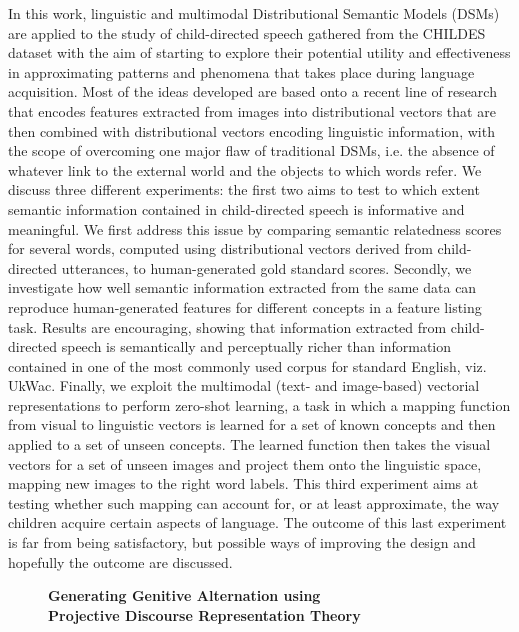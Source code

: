 \documentclass[10pt, a4paper, twopage, headinclude, footinclude, BCOR5mm]{scrartcl}
\begin{document}
\noindent
  In this work, linguistic and multimodal Distributional Semantic Models (DSMs) are applied to the study of child-directed speech gathered from the CHILDES dataset with the aim of starting to explore their potential utility and effectiveness in approximating patterns and phenomena that takes place during language acquisition. Most of the ideas developed are based onto a recent line of research that encodes features extracted from images into distributional vectors that are then combined with distributional vectors encoding linguistic information, with the scope of overcoming one major flaw of traditional DSMs, i.e. the absence of whatever link to the external world and the objects to which words refer.   We discuss three different experiments: the first two aims to test to which extent semantic information contained in child-directed speech is informative and meaningful. We first address this issue by comparing semantic relatedness scores for several words, computed using distributional vectors derived from child-directed utterances, to human-generated gold standard scores. Secondly, we investigate how well semantic information extracted from the same data can reproduce human-generated features for different concepts in a feature listing task. Results are encouraging, showing that information extracted from child-directed speech is semantically and perceptually richer than information contained in one of the most commonly used corpus for standard English, viz. UkWac.   Finally, we exploit the multimodal (text- and image-based) vectorial representations to perform zero-shot learning, a task in which a mapping function from visual to linguistic vectors is learned for a set of known concepts and then applied to a set of unseen concepts. The learned function then takes the visual vectors for a set of unseen images and project them onto the linguistic space, mapping new images to the right word labels. This third experiment aims at testing whether such mapping can account for, or at least approximate, the way children acquire certain aspects of language. The outcome of this last experiment is far from being satisfactory, but possible ways of improving the design and hopefully the outcome are discussed.


\newpage

\begin{figure}[t!]
\centering
\large\textbf{Generating Genitive Alternation using \\ Projective Discourse Representation Theory}
\vspace*{0.5cm}
\end{figure}
\end{document}
